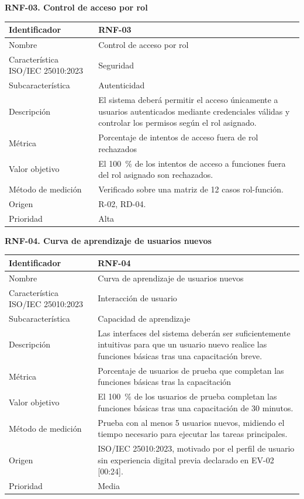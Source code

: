 \documentclass[12pt,a4paper]{article}
\begin{document}
\bigskip
\noindent\textbf{RNF-03. Control de acceso por rol}
\label{tab:RNF-03}

\begin{center}
\begin{longtable}{|p{4.2cm}|p{10cm}|}
\hline
Identificador & RNF-03 \\
\hline
Nombre & Control de acceso por rol \\
\hline
Característica ISO/IEC 25010:2023 & Seguridad \\
\hline
Subcaracterística & Autenticidad \\
\hline
Descripción & El sistema deberá permitir el acceso únicamente a usuarios autenticados mediante credenciales válidas y controlar los permisos según el rol asignado. \\
\hline
Métrica & Porcentaje de intentos de acceso fuera de rol rechazados \\
\hline
Valor objetivo & El 100~\% de los intentos de acceso a funciones fuera del rol asignado son rechazados. \\
\hline
Método de medición & Verificado sobre una matriz de 12 casos rol-función. \\
\hline
Origen & R-02, RD-04. \\
\hline
Prioridad & Alta \\
\hline
\end{longtable}
\end{center}

\bigskip
\noindent\textbf{RNF-04. Curva de aprendizaje de usuarios nuevos}
\label{tab:RNF-04}

\begin{center}
\begin{longtable}{|p{4.2cm}|p{10cm}|}
\hline
Identificador & RNF-04 \\
\hline
Nombre & Curva de aprendizaje de usuarios nuevos \\
\hline
Característica ISO/IEC 25010:2023 & Interacción de usuario \\
\hline
Subcaracterística & Capacidad de aprendizaje \\
\hline
Descripción & Las interfaces del sistema deberán ser suficientemente intuitivas para que un usuario nuevo realice las funciones básicas tras una capacitación breve. \\
\hline
Métrica & Porcentaje de usuarios de prueba que completan las funciones básicas tras la capacitación \\
\hline
Valor objetivo & El 100~\% de los usuarios de prueba completan las funciones básicas tras una capacitación de 30 minutos. \\
\hline
Método de medición & Prueba con al menos 5 usuarios nuevos, midiendo el tiempo necesario para ejecutar las tareas principales. \\
\hline
Origen & ISO/IEC 25010:2023, motivado por el perfil de usuario sin experiencia digital previa declarado en EV-02 [00:24]. \\
\hline
Prioridad & Media \\
\hline
\end{longtable}
\end{center}
\end{document}
